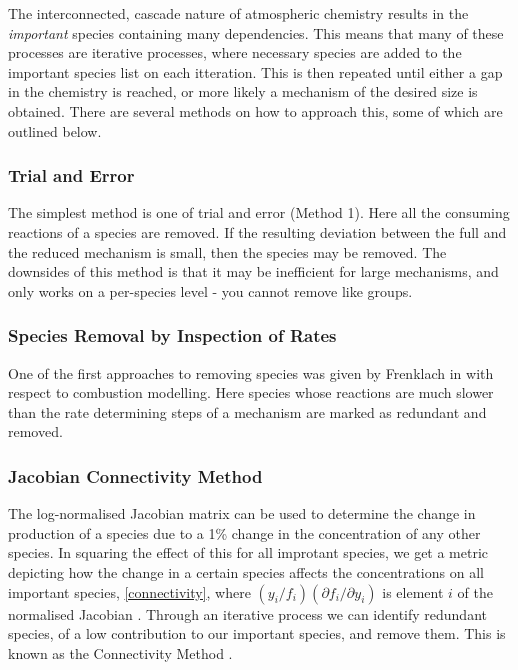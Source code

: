 \documentclass{pasa}%
\begin{document}
The interconnected, cascade nature of atmospheric chemistry results in the \emph{important} species containing many dependencies. This means that many of these processes are iterative processes, where necessary species are added to the important species list on each itteration. This is then repeated until either a gap in the chemistry is reached, or more likely a mechanism of the desired size is obtained. There are several methods on how to approach this, some of which are outlined below. 

\subsubsection{Trial and Error}
The simplest method is one of trial and error \cite{tur1990} (Method 1). Here all the consuming reactions of a species are removed. If the resulting deviation between the full and the reduced mechanism is small, then the species may be removed. The downsides of this method is that it may be inefficient for large mechanisms, and only works on a per-species level - you cannot remove like groups. 

\subsubsection{Species Removal by Inspection of Rates}
One of the first approaches to removing species was given by Frenklach in \cite{frenk} with respect to combustion modelling. Here species whose reactions are much slower than the rate determining steps of a mechanism are marked as redundant and removed. 

\subsubsection{Jacobian Connectivity Method}

The log-normalised Jacobian matrix can be used to determine the change in production of a species due to a 1\% change in the concentration of any other species. In squaring the effect of this for all improtant species, we get a metric depicting how the change in a certain species affects the concentrations on all important species, \autoref{connectivity}, where $({y_i}/{f_i})({\partial f_i}/{\partial y_i})$ is element $i$ of the normalised Jacobian . Through an iterative process we can identify redundant species, of a low contribution to our important species, and remove them. This is known as the Connectivity Method \cite{cm}.
\end{document}
